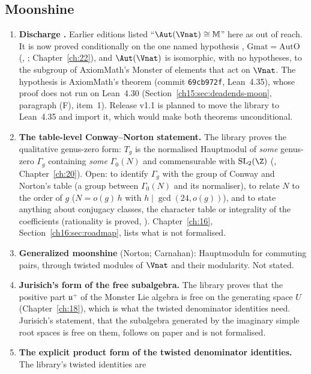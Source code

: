 \subsection{Moonshine}
\begin{enumerate}
\item \textbf{Discharge .} Earlier editions listed ``$\Aut(\Vnat)\cong\mathbb M$'' here as out of
  reach. It is now proved conditionally on the one named hypothesis , $\mathrm{Gmat}=\mathrm{AutO}$
  (, ; Chapter~\ref{ch:22}), and $\Aut(\Vnat)$ is isomorphic, with no
  hypotheses, to the subgroup of AxiomMath's Monster of elements that act on $\Vnat$. The hypothesis is AxiomMath's
  theorem  (commit \texttt{69cb972f}, Lean~4.35), whose
  proof does not run on Lean~4.30 (Section~\ref{ch15:sec:deadends-moon}, paragraph (F), item~1). Release v1.1 is planned to move the
  library to Lean~4.35 and import it, which would make both theorems unconditional.
\item \textbf{The table-level Conway--Norton statement.} The library proves the qualitative genus-zero form: $T_g$ is the
  normalised Hauptmodul of \emph{some} genus-zero $\Gamma_g$ containing \emph{some} $\Gamma_0(N)$ and commensurable with
  $\mathrm{SL}_2(\Z)$ (, Chapter~\ref{ch:20}). Open: to identify $\Gamma_g$ with the group of Conway and
  Norton's table (a group between $\Gamma_0(N)$ and its normaliser), to relate $N$ to the order of $g$ ($N=o(g)\,h$ with
  $h\mid\gcd(24,o(g))$), and to state anything about conjugacy classes, the character table or integrality of the
  coefficients (rationality is proved, ). Chapter~\ref{ch:16}, Section~\ref{ch16:sec:roadmap}, lists
  what is not formalised.
\item \textbf{Generalized moonshine} (Norton; Carnahan): Hauptmoduln for commuting pairs, through twisted modules of
  $\Vnat$ and their modularity. Not stated.
\item \textbf{Jurisich's form of the free subalgebra.} The library proves that the positive part $\mathfrak u^+$ of the
  Monster Lie algebra is free on the generating space $U$ (Chapter~\ref{ch:18}), which is what the twisted denominator
  identities need. Jurisich's statement, that the subalgebra generated by the imaginary simple root spaces is free on
  them, follows on paper and is not formalised.
\item \textbf{The explicit product form of the twisted denominator identities.} The library's twisted identities are

\end{enumerate}
